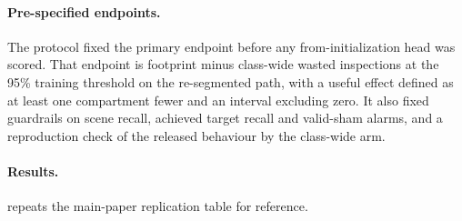 \paragraph{Pre-specified endpoints.} The protocol fixed the primary endpoint before any from-initialization head was scored. That endpoint is footprint minus class-wide wasted inspections at the 95\% training threshold on the re-segmented path, with a useful effect defined as at least one compartment fewer and an interval excluding zero. It also fixed guardrails on scene recall, achieved target recall and valid-sham alarms, and a reproduction check of the released behaviour by the class-wide arm. \scratchEndpoints
\paragraph{Results.}  repeats the main-paper replication table for reference.
\begin{table}[t]
\centering
\caption{Replication with the full recipe (copy of the main-paper table).}
\label{tab:replication_supp}
\small

\end{table}
